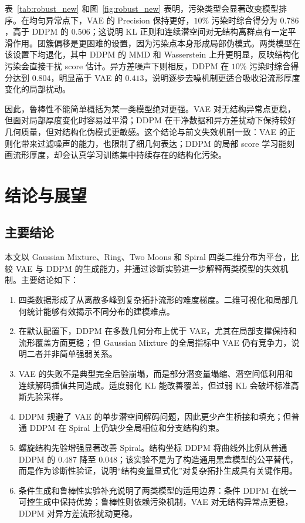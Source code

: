 \documentclass[10pt, a4paper, oneside]{ctexart}
\numberwithin{equation}{section}
\numberwithin{table}{section}
\numberwithin{figure}{section}
\begin{document}
表~\ref{tab:robust_new} 和图~\ref{fig:robust_new} 表明，污染类型会显著改变模型排序。在均匀异常点下，VAE 的 Precision 保持更好，$10\%$ 污染时综合得分为 $0.786$，高于 DDPM 的 $0.506$；这说明 KL 正则和连续潜空间对无结构离群点有一定平滑作用。团簇偏移是更困难的设置，因为污染点本身形成局部伪模式。两类模型在该设置下均退化，其中 DDPM 的 MMD 和 Wasserstein 上升更明显，反映结构化污染会直接干扰 score 估计。异方差噪声下则相反，DDPM 在 $10\%$ 污染时综合得分达到 $0.804$，明显高于 VAE 的 $0.413$，说明逐步去噪机制更适合吸收沿流形厚度变化的局部扰动。

因此，鲁棒性不能简单概括为某一类模型绝对更强。VAE 对无结构异常点更稳，但面对局部厚度变化时容易过平滑；DDPM 在干净数据和异方差扰动下保持较好几何质量，但对结构化伪模式更敏感。这个结论与前文失效机制一致：VAE 的正则化带来过滤噪声的能力，也限制了细几何表达；DDPM 的局部 score 学习能刻画流形厚度，却会认真学习训练集中持续存在的结构化污染。

\section{结论与展望}

\subsection{主要结论}

本文以 Gaussian Mixture、Ring、Two Moons 和 Spiral 四类二维分布为平台，比较 VAE 与 DDPM 的生成能力，并通过诊断实验进一步解释两类模型的失效机制。主要结论如下：

\begin{enumerate}[label=(\arabic*)]
    \item 四类数据形成了从离散多峰到复杂拓扑流形的难度梯度。二维可视化和局部几何统计能够有效揭示不同分布的建模难点。
    \item 在默认配置下，DDPM 在多数几何分布上优于 VAE，尤其在局部支撑保持和流形覆盖方面更稳；但 Gaussian Mixture 的全局指标中 VAE 仍有竞争力，说明二者并非简单强弱关系。
    \item VAE 的失败不是典型完全后验崩塌，而是部分潜变量塌缩、潜空间低利用和连续解码插值共同造成。适度弱化 KL 能改善覆盖，但过弱 KL 会破坏标准高斯先验采样。
    \item DDPM 规避了 VAE 的单步潜空间解码问题，因此更少产生桥接和填充；但普通 DDPM 在 Spiral 上仍缺少全局相位和分支结构约束。
    \item 螺旋结构先验增强显著改善 Spiral。结构坐标 DDPM 将曲线外比例从普通 DDPM 的 $0.487$ 降至 $0.048$；该实验不是为了构造通用黑盒模型的公平替代，而是作为诊断性验证，说明“结构变量显式化”对复杂拓扑生成具有关键作用。
    \item 条件生成和鲁棒性实验补充说明了两类模型的适用边界：条件 DDPM 在统一可控生成中保持优势；鲁棒性则依赖污染机制，VAE 对无结构异常点更稳，DDPM 对异方差流形扰动更稳。
\end{enumerate}
\end{document}
